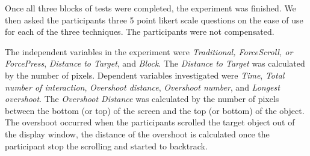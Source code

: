 \documentclass{sigchi}
\begin{document}
%
%
%

Once all three blocks of tests were completed, the experiment was finished. We then asked the participants three 5 point likert scale questions on the ease of use for each of the three techniques. The participants were not compensated.

The independent variables in the experiment were \textit{Traditional, ForceScroll, or ForcePress}, \textit{Distance to Target}, and \textit{Block}. The \textit{Distance to Target} was calculated by the number of pixels. Dependent variables investigated were \textit{Time}, \textit{Total number of interaction}, \textit{Overshoot distance}, \textit{Overshoot number}, and \textit{Longest overshoot}. The \textit{Overshoot Distance} was calculated by the number of pixels between the bottom (or top) of the screen and the top (or bottom) of the object. The overshoot occurred when the participants scrolled the target object out of the display window, the distance of the overshoot is calculated once the participant stop the scrolling and started to backtrack.   
\end{document}
